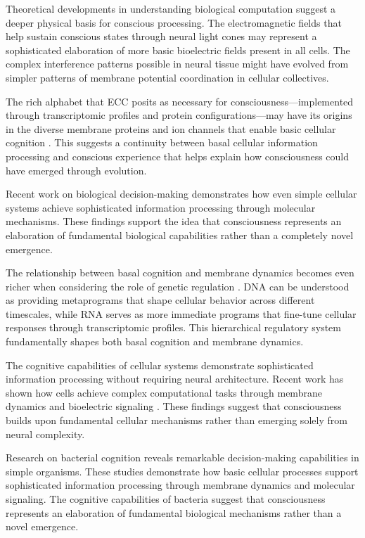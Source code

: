 Theoretical developments in understanding biological computation \cite{Levin2018} suggest a deeper physical basis for conscious processing. The electromagnetic fields that help sustain conscious states through neural light cones may represent a sophisticated elaboration of more basic bioelectric fields present in all cells. The complex interference patterns possible in neural tissue might have evolved from simpler patterns of membrane potential coordination in cellular collectives.

The rich alphabet that ECC posits as necessary for consciousness—implemented through transcriptomic profiles and protein configurations—may have its origins in the diverse membrane proteins and ion channels that enable basic cellular cognition \cite{Fields2020}. This suggests a continuity between basal cellular information processing and conscious experience that helps explain how consciousness could have emerged through evolution.

Recent work on biological decision-making \cite{Mitchell2016} demonstrates how even simple cellular systems achieve sophisticated information processing through molecular mechanisms. These findings support the idea that consciousness represents an elaboration of fundamental biological capabilities rather than a completely novel emergence.

The relationship between basal cognition and membrane dynamics becomes even richer when considering the role of genetic regulation \cite{Manicka2019}. DNA can be understood as providing metaprograms that shape cellular behavior across different timescales, while RNA serves as more immediate programs that fine-tune cellular responses through transcriptomic profiles. This hierarchical regulatory system fundamentally shapes both basal cognition and membrane dynamics.

The cognitive capabilities of cellular systems \cite{Lyon2015} demonstrate sophisticated information processing without requiring neural architecture. Recent work has shown how cells achieve complex computational tasks through membrane dynamics and bioelectric signaling \cite{Levin2018}. These findings suggest that consciousness builds upon fundamental cellular mechanisms rather than emerging solely from neural complexity.

Research on bacterial cognition \cite{Shapiro2007} reveals remarkable decision-making capabilities in simple organisms. These studies demonstrate how basic cellular processes support sophisticated information processing through membrane dynamics and molecular signaling. The cognitive capabilities of bacteria suggest that consciousness represents an elaboration of fundamental biological mechanisms rather than a novel emergence.

